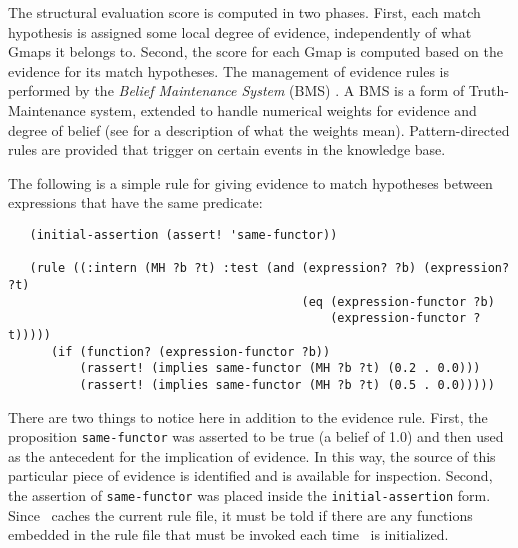 \indent
{}

The structural evaluation score is computed in two phases. First, each match
hypothesis is assigned some local degree of evidence, independently of what
Gmaps it belongs to.  Second, the score for each Gmap is computed based on
the evidence for its match hypotheses.  The management of evidence rules is
performed by the {\it Belief Maintenance System} (BMS) \cite{BMS}. A BMS is
a form of Truth-Maintenance system, extended to handle numerical weights for
evidence and degree of belief (see \cite{BMS} for a description of what the
weights mean). Pattern-directed rules are provided that trigger on certain
events in the knowledge base. 

The following is a simple rule for giving evidence to match hypotheses
between expressions that have the same predicate:

\begin{small}
\begin{verbatim}
   (initial-assertion (assert! 'same-functor))

   (rule ((:intern (MH ?b ?t) :test (and (expression? ?b) (expression? ?t)
                                         (eq (expression-functor ?b)
                                             (expression-functor ?t)))))
      (if (function? (expression-functor ?b))
          (rassert! (implies same-functor (MH ?b ?t) (0.2 . 0.0)))
          (rassert! (implies same-functor (MH ?b ?t) (0.5 . 0.0)))))
\end{verbatim}
\end{small}

There are two things to notice here in addition to the evidence rule. First,
the proposition {\tt same-functor} was asserted to be true (a belief of
1.0) and then used as the antecedent for the implication of evidence. In
this way, the source of this particular piece of evidence is identified and
is available for inspection. Second, the assertion of {\tt same-functor} was
placed inside the {\tt initial-assertion} form. Since \SME\ caches the
current rule file, it must be told if there are any functions embedded in
the rule file that must be invoked each time \SME\ is initialized.


